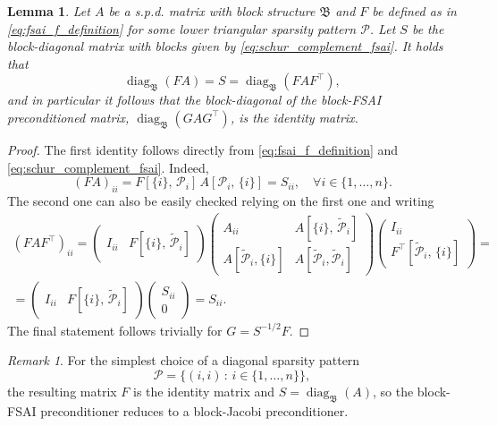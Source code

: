 \documentclass[a4paper]{article}
\DeclareMathOperator{\diag}{diag}
\theoremstyle{plain}
\newtheorem{lemma}{Lemma}[section]
\theoremstyle{definition}
\theoremstyle{remark}
\newtheorem{remark}{Remark}[section]
\begin{document}
\begin{lemma}\label{thm:fsai_block_diagonal}
	Let \(A\) be a s.p.d. matrix with block structure \(\mathfrak{B}\) and \(F\) be defined as in \eqref{eq:fsai_f_definition} for some lower triangular sparsity pattern \(\mathcal{P}\). Let \(S\) be the block-diagonal matrix with blocks given by \eqref{eq:schur_complement_fsai}. It holds that
	\begin{equation*}
		\diag_{\mathfrak{B}}(FA) = S = \diag_{\mathfrak{B}}(FAF^{\top}),
	\end{equation*}
	and in particular it follows that the block-diagonal of the block-FSAI preconditioned matrix, \(\diag_{\mathfrak{B}}(GAG^{\top})\), is the identity matrix.
\end{lemma}
\begin{proof}
	The first identity follows directly from \eqref{eq:fsai_f_definition} and \eqref{eq:schur_complement_fsai}. Indeed,
	\begin{equation*}
		(FA)_{ii} = F[\{i\}, \, \mathcal{P}_i] \, A[\mathcal{P}_i,\, \{i\}] = S_{ii}, \quad \forall i \in \{1,\dots,n\}.
	\end{equation*}
	The second one can also be easily checked relying on the first one and writing
	\begin{multline*}
		(F A F^{\top})_{ii} = \begin{pmatrix}
			I_{ii} & F[\{i\}, \, \tilde{\mathcal{P}}_i]
		\end{pmatrix}
		\begin{pmatrix}
			A_{ii} & A[\{i\},\, \tilde{\mathcal{P}}_i] \\
			A[\tilde{\mathcal{P}}_i, \{i\}] & A[\tilde{\mathcal{P}}_i, \tilde{\mathcal{P}}_i] 
		\end{pmatrix}
		\begin{pmatrix}
			I_{ii} \\ F^{\top}[\tilde{\mathcal{P}}_i, \, \{i\}]
		\end{pmatrix} =\\
		= \begin{pmatrix}
			I_{ii} & F[\{i\}, \, \tilde{\mathcal{P}}_i]
		\end{pmatrix}
		\begin{pmatrix}
			S_{ii} \\ 0
		\end{pmatrix} = S_{ii}.
	\end{multline*}
	The final statement follows trivially for \(G = S^{-1/2} F\).
\end{proof}

\begin{remark}
	For the simplest choice of a diagonal sparsity pattern
	\begin{equation*}
		\mathcal{P} = \{(i, i) \,\colon\, i \in\{1, \dots, n\}\},
	\end{equation*}	
	the resulting matrix \(F\) is the identity matrix and \(S = \diag_{\mathfrak{B}}(A)\), so the block-FSAI preconditioner reduces to a block-Jacobi preconditioner.
\end{remark}
\end{document}
